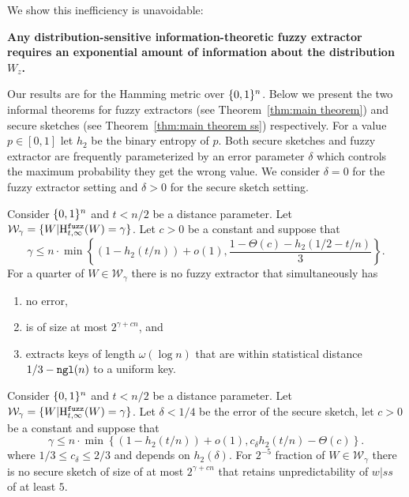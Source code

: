 We show this inefficiency is unavoidable:
\begin{displayquote}
\textbf{Any distribution-sensitive information-theoretic fuzzy extractor requires an exponential amount of information about the distribution $W_z$.} 
\end{displayquote} 
Our results are for the Hamming metric over $\{0, 1\}^n$. Below we present the two informal theorems for fuzzy extractors (see Theorem~\ref{thm:main theorem}) and secure sketches (see Theorem~\ref{thm:main theorem ss}) respectively.  For a value $p\in [0,1]$ let $h_2$ be the binary entropy of $p$. 
Both secure sketches and fuzzy extractor are frequently parameterized by an error parameter $\delta$ which controls the maximum probability they get the wrong value.  We consider $\delta=0$ for the fuzzy extractor setting and $\delta>0$ for the secure sketch setting. 

\begin{theorem}
Consider $\{0, 1\}^n$ and $t< n/2$ be a distance parameter.  Let $\mathcal{W}_\gamma=\{W | \mathrm{H}^{\mathtt{fuzz}}_{t,\infty}(W) = \gamma\}$.  Let $c>0$ be a constant and suppose that \[
\gamma \le n\cdot\min\left\{(1-h_2(t/n)) +o(1), \frac{1-\Theta(c)-h_2(1/2-t/n)}{3}\right\}.
\]
 For a quarter of $W \in \mathcal{W}_\gamma$ there is no fuzzy extractor that simultaneously has 
 \begin{enumerate}
 \itemsep0em
 \item no error,
 \item is of size at most $2^{\gamma+cn}$, and 
 \item extracts keys of length $\omega(\log n)$ that are within statistical distance $1/3-\mathtt{ngl}(n)$ to a uniform key.
 \end{enumerate}
\end{theorem}


\begin{theorem}
Consider $\{0, 1\}^n$ and $t< n/2$ be a distance parameter.  Let $\mathcal{W}_\gamma=\{W | \mathrm{H}^{\mathtt{fuzz}}_{t,\infty}(W) = \gamma\}$.  Let $\delta<1/4$ be the error of the secure sketch, let $c>0$ be a constant and suppose that \[
\gamma \le n\cdot\min\left\{(1-h_2(t/n)) +o(1), c_\delta h_2(t/n)-\Theta(c)\right\}.
\]
where $1/3\le  c_\delta \le 2/3$ and depends on $h_2(\delta)$. 
 For $2^{-5}$ fraction of $W \in \mathcal{W}_\gamma$ there is no secure sketch of
size of at most $2^{\gamma+cn}$ that
 retains unpredictability of $w|ss$ of at  least $5$.
\end{theorem}

